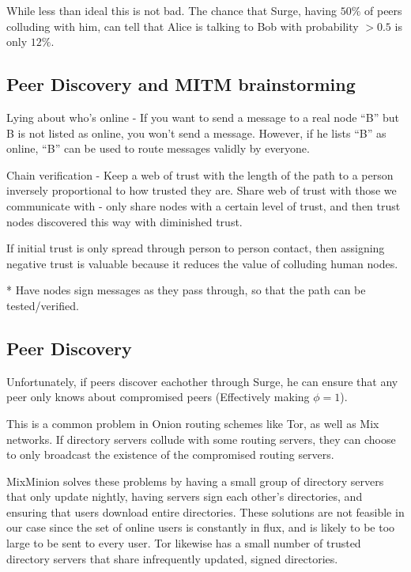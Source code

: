 \documentclass[twocolumn]{paper}
\begin{document}
While less than ideal this is not bad. The chance that Surge, having $50\%$ of peers colluding with him, can tell that Alice is talking to Bob with probability $> 0.5$ is only $12\%$. 

\subsection{Peer Discovery and MITM brainstorming}

Lying about who's online - If you want to send a message to a real node ``B'' but B is not listed as online, you won't send a message. However, if he lists ``B'' as online, ``B'' can be used to route messages validly by everyone. 

Chain verification - Keep a web of trust with the length of the path to a person inversely proportional to how trusted they are. Share web of trust with those we communicate with - only share nodes with a certain level of trust, and then trust nodes discovered this way with diminished trust. 

If initial trust is only spread through person to person contact, then assigning negative trust is valuable because it reduces the value of colluding human nodes. 

* Have nodes sign messages as they pass through, so that the path can be tested/verified. 

\subsection{Peer Discovery}
Unfortunately, if peers discover eachother through Surge, he can ensure that any peer only knows about compromised peers (Effectively making $\phi = 1$).

This is a common problem in Onion routing schemes like Tor, as well as Mix networks. If directory servers collude with some routing servers, they can choose to only broadcast the existence of the compromised routing servers.

MixMinion \cite{minion-design} solves these problems by having a small group of directory servers that only update nightly, having servers sign each other's directories, and ensuring that users download entire directories. These solutions are not feasible in our case since the set of online users is constantly in flux, and is likely to be too large to be sent to every user. Tor \cite{tor-design} likewise has a small number of trusted directory servers that share infrequently updated, signed directories.
\end{document}
